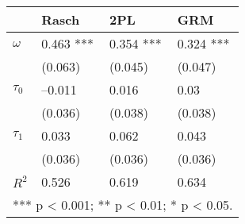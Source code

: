 \begin{tabular}{llll}
  \hline
  & Rasch & 2PL & GRM \\ 
   \hline
$\omega$ & 0.463 *** & 0.354 *** & 0.324 *** \\ 
   & (0.063) & (0.045) & (0.047) \\ 
  $\tau_0$ & --0.011 & 0.016 & 0.03 \\ 
   & (0.036) & (0.038) & (0.038) \\ 
  $\tau_1$ & 0.033 & 0.062 & 0.043 \\ 
   & (0.036) & (0.036) & (0.036) \\ 
   \hline
$R^2$ & 0.526 & 0.619 & 0.634 \\ 
   \hline
\multicolumn{5}{l}{  *** p < 0.001;  ** p < 0.01;  * p < 0.05. } &  &  &  \\ 
  \end{tabular}

